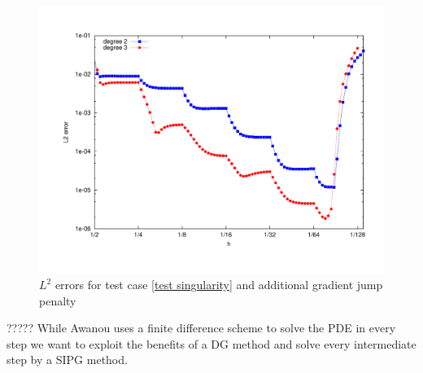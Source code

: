 \begin{figure}[h!]
	\includegraphics[scale =0.5]{plots/MA2.pdf}
	\caption{$L^2$ errors for test case \ref{test singularity} and additional gradient jump penalty}
	\label{fig: l2 errors test singularity ourMethod}
\end{figure}



?????
While Awanou uses a finite difference scheme to solve the PDE in every step we want to exploit the benefits of a DG method and solve every intermediate step by a SIPG method. 
